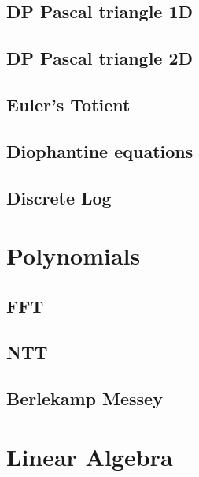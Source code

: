 \documentclass[10pt]{article}
\begin{document}
\begin{multicols*}{2}
\subsection{DP Pascal triangle 1D}

\subsection{DP Pascal triangle 2D}



\subsection{Euler's Totient}


\subsection{Diophantine equations}


\subsection{Discrete Log}


\section{Polynomials}

\subsection{FFT}


\subsection{NTT}


\subsection{Berlekamp Messey}


\section{Linear Algebra}


\end{multicols*}
\end{document}
